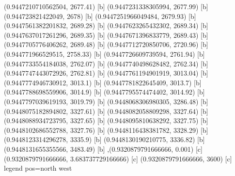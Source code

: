 {{{(0.9447210710562504, 2677.41) [b] 
(0.9447231338305994, 2677.99) [b] 
(0.944723821422049, 2678) [b] 
(0.9447251966049484, 2679.93) [b] 
(0.9447561382201832, 2689.28) [b] 
(0.9447623265432302, 2689.34) [b] 
(0.9447637017261296, 2689.35) [b] 
(0.9447671396833779, 2689.43) [b] 
(0.9447705776406262, 2689.48) [b] 
(0.9447712720850706, 2720.96) [b] 
(0.944771966529515, 2758.33) [b] 
(0.9447726609739594, 2761.94) [b] 
(0.9447733554184038, 2762.07) [b] 
(0.9447740498628482, 2762.34) [b] 
(0.9447747443072926, 2762.81) [b] 
(0.9447761194901919, 3013.04) [b] 
(0.9447774946730912, 3013.1) [b] 
(0.9447781822645409, 3013.7) [b] 
(0.9447788698559906, 3014.9) [b] 
(0.9447795574474402, 3014.92) [b] 
(0.9447797039619193, 3019.79) [b] 
(0.9448068306980305, 3286.48) [b] 
(0.9448075182894802, 3327.61) [b] 
(0.9448082058809298, 3327.64) [b] 
(0.9448088934723795, 3327.65) [b] 
(0.9448095810638292, 3327.75) [b] 
(0.9448102686552788, 3327.76) [b] 
(0.9448116438381782, 3328.29) [b] 
(0.9448123314296278, 3335.9) [b] 
(0.9448130190210775, 3336.82) [b] 
(0.9448131655355566, 3483.49) [b] 
},{(0.9320879791666666, 0.001) [c] 
(0.9320879791666666, 3.683737729166666) [c] 
(0.9320879791666666, 3600) [c] 
}}}{legend pos=north west}